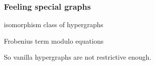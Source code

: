\begin{frame}
    \frametitle{Feeling special graphs}

    \centering

    \begin{minipage}{0.45\textwidth}
        \begin{center}
            isomorphism class of hypergraphs

            \vspace{1em}

        \end{center}
    \end{minipage}
    \quad
    \raisebox{-1em}{\(\leftrightarrow\)}
    \pause
    \begin{minipage}{0.45\textwidth}
        \begin{center}
            Frobenius term modulo equations

            \vspace{1em}

        \end{center}
    \end{minipage}

    \vspace{1em}
    \normalsize
    \scalebox{0.75}{\hypergraphpeople}

    \Large
    \pause
    So vanilla hypergraphs are \alert{not restrictive enough}.

\end{frame}

